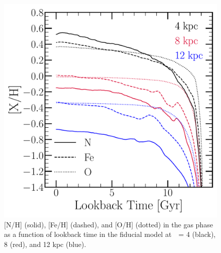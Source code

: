 \documentclass[ms.tex]{subfiles}
\begin{document}
\begin{figure} 
\centering 
\includegraphics[scale = 0.45]{nh_feh_vs_lookback.pdf} 
\caption{
[N/H] (solid), [Fe/H] (dashed), and [O/H] (dotted) in the gas phase as a 
function of lookback time in the fiducial model at~\rgal~= 4 (black), 8 (red), 
and 12 kpc (blue). 
}
\label{fig:xh_lookback} 
\end{figure} 
\end{document}

